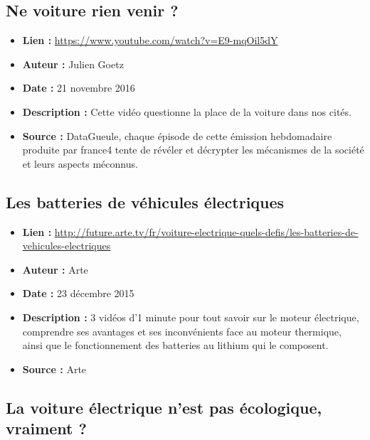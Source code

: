 \documentclass[8pt]{article}
\begin{document}
\newpage
\subsection{Ne voiture rien venir ?}
 
\begin{itemize}
	\item \textbf{Lien : }  \url{https://www.youtube.com/watch?v=E9-mqOil5dY} 
	\item \textbf{Auteur : } Julien Goetz
	\item \textbf{Date : } 21 novembre 2016
	\item \textbf{Description : } Cette vidéo questionne la place de la voiture dans nos cités.
	\item \textbf{Source : } DataGueule, chaque épisode de cette émission hebdomadaire produite par france4 tente de révéler et décrypter les mécanismes de la société et leurs aspects méconnus.
\end{itemize}

\newpage
\subsection{Les batteries de véhicules électriques}
 
\begin{itemize}
	\item \textbf{Lien : }  \url{http://future.arte.tv/fr/voiture-electrique-quels-defis/les-batteries-de-vehicules-electriques} 
	\item \textbf{Auteur :} Arte
	\item \textbf{Date : } 23 décembre 2015
	\item \textbf{Description : } 3 vidéos d'1 minute pour tout savoir sur le moteur électrique, comprendre ses avantages et ses inconvénients face au moteur thermique, ainsi que le fonctionnement des batteries au lithium qui le composent.
	\item \textbf{Source : } Arte
\end{itemize}

\newpage
\subsection{La voiture électrique n’est pas écologique, vraiment ?}
 
\end{document}
